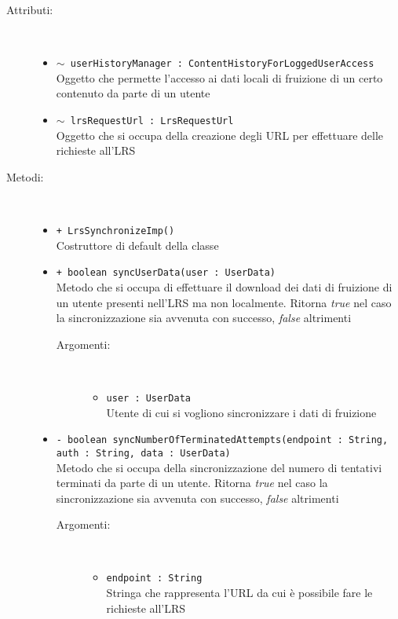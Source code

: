 \documentclass[../Tesi.tex]{subfiles}
\begin{document}
		\begin{description}
			\item[Attributi:] \
			\begin{itemize}
				\item \texttt{$\sim$ userHistoryManager : ContentHistoryForLoggedUserAccess}\\
				Oggetto che permette l'accesso ai dati locali di fruizione di un certo contenuto da parte di un utente

				\item \texttt{$\sim$ lrsRequestUrl : LrsRequestUrl}\\
				Oggetto che si occupa della creazione degli URL per effettuare delle richieste all'LRS
			\end{itemize}

			\item[Metodi:] \
			\begin{itemize}
				\item \texttt{+ LrsSynchronizeImp()}\\
				Costruttore di default della classe 
				
				\item \texttt{+ boolean syncUserData(user : UserData)}\\
				Metodo che si occupa di effettuare il download dei dati di fruizione di un utente presenti nell'LRS ma non localmente. Ritorna \textit{true} nel caso la sincronizzazione sia avvenuta con successo, \textit{false} altrimenti
				\begin{description}
					\item[Argomenti:] \
					\begin{itemize}
						\item \texttt{user : UserData}\\
						Utente di cui si vogliono sincronizzare i dati di fruizione
					\end{itemize}
				\end{description}

				\item \texttt{- boolean syncNumberOfTerminatedAttempts(endpoint : String, auth : String, data : UserData)}\\
				Metodo che si occupa della sincronizzazione del numero di tentativi terminati da parte di un utente. Ritorna \textit{true} nel caso la sincronizzazione sia avvenuta con successo, \textit{false} altrimenti
				\begin{description}
					\item[Argomenti:] \
					\begin{itemize}
						\item \texttt{endpoint : String}\\
						Stringa che rappresenta l'URL da cui è possibile fare le richieste all'LRS


\end{itemize}
\end{description}
\end{itemize}
\end{description}
\end{document}
